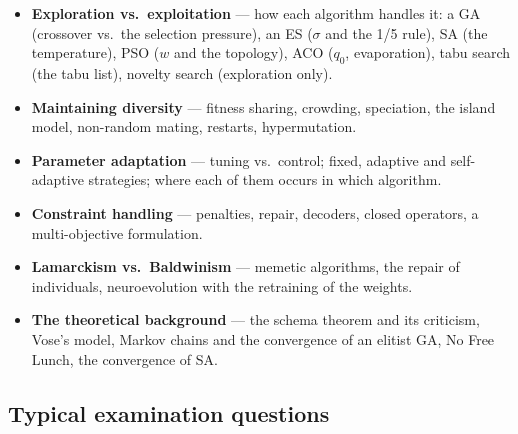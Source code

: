 \documentclass[11pt,a4paper]{article}
\theoremstyle{definition}
\begin{document}
\begin{itemize}
\item \textbf{Exploration vs.\ exploitation} --- how each algorithm handles it:
  a GA (crossover vs.\ the selection pressure), an ES ($\sigma$ and the 1/5
  rule), SA (the temperature), PSO ($w$ and the topology), ACO ($q_0$,
  evaporation), tabu search (the tabu list), novelty search (exploration only).
\item \textbf{Maintaining diversity} --- fitness sharing, crowding, speciation,
  the island model, non-random mating, restarts, hypermutation.
\item \textbf{Parameter adaptation} --- tuning vs.\ control; fixed, adaptive and
  self-adaptive strategies; where each of them occurs in which algorithm.
\item \textbf{Constraint handling} --- penalties, repair, decoders, closed
  operators, a multi-objective formulation.
\item \textbf{Lamarckism vs.\ Baldwinism} --- memetic algorithms, the repair of
  individuals, neuroevolution with the retraining of the weights.
\item \textbf{The theoretical background} --- the schema theorem and its
  criticism, Vose's model, Markov chains and the convergence of an elitist GA,
  No Free Lunch, the convergence of SA.
\end{itemize}

\subsection*{Typical examination questions}
\end{document}
